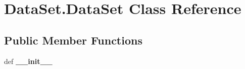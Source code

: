 \hypertarget{classDataSet_1_1DataSet}{\section{Data\-Set.\-Data\-Set Class Reference}
\label{classDataSet_1_1DataSet}
}
\subsection*{Public Member Functions}
\begin{DoxyCompactItemize}
\item 
\hypertarget{classDataSet_1_1DataSet_ae3eb8140a6a2ff62586c52158cb4cf21}{def {\bfseries \-\_\-\-\_\-init\-\_\-\-\_\-}}\label{classDataSet_1_1DataSet_ae3eb8140a6a2ff62586c52158cb4cf21}

\end{DoxyCompactItemize}
